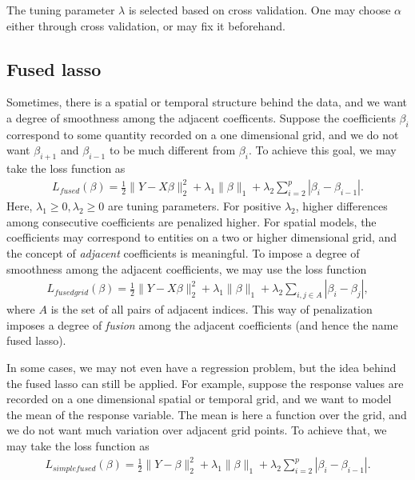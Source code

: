 \documentclass[
]{book}
\begin{document}
The tuning parameter \(\lambda\) is selected based on cross validation. One may choose \(\alpha\) either through cross validation, or may fix it beforehand.

\hypertarget{fusedlasso-description}{%
\subsection{Fused lasso}\label{fusedlasso-description}}

Sometimes, there is a spatial or temporal structure behind the data, and we want a degree of smoothness among the adjacent coefficents. Suppose the coefficients \(\beta_i\) correspond to some quantity recorded on a one dimensional grid, and we do not want \(\beta_{i+1}\) and \(\beta_{i-1}\) to be much different from \(\beta_i\). To achieve this goal, we may take the loss function as
\begin{align*}
L_{fused}(\beta) = \frac{1}{2} \| Y - X \beta \|^2_2 + \lambda_1 \| \beta \|_1 + \lambda_2 \sum_{i=2}^p | \beta_i - \beta_{i-1} | .
\end{align*}
Here, \(\lambda_1 \ge 0, \lambda_2 \ge 0\) are tuning parameters. For positive \(\lambda_2\), higher differences among consecutive coefficients are penalized higher. For spatial models, the coefficients may correspond to entities on a two or higher dimensional grid, and the concept of \emph{adjacent} coefficients is meaningful. To impose a degree of smoothness among the adjacent coefficients, we may use the loss function
\begin{align*}
L_{fusedgrid}(\beta) = \frac{1}{2} \| Y - X \beta \|^2_2 + \lambda_1 \| \beta \|_1 + \lambda_2 \sum_{i, j \in A} | \beta_i - \beta_j | ,
\end{align*}
where \(A\) is the set of all pairs of adjacent indices. This way of penalization imposes a degree of \emph{fusion} among the adjacent coefficients (and hence the name fused lasso).

In some cases, we may not even have a regression problem, but the idea behind the fused lasso can still be applied. For example, suppose the response values are recorded on a one dimensional spatial or temporal grid, and we want to model the mean of the response variable. The mean is here a function over the grid, and we do not want much variation over adjacent grid points. To achieve that, we may take the loss function as
\begin{align*}
L_{simplefused}(\beta) = \frac{1}{2} \| Y - \beta \|^2_2 + \lambda_1 \| \beta \|_1 + \lambda_2 \sum_{i=2}^p | \beta_i - \beta_{i-1} | .
\end{align*}
\end{document}
